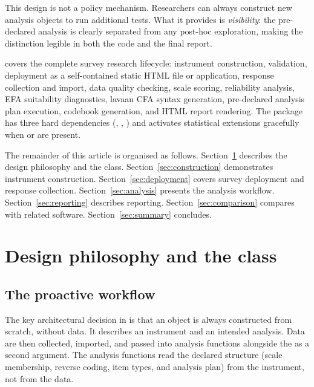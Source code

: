 \documentclass[article]{jss}\usepackage[]{graphicx}\usepackage[]{xcolor}
\begin{document}
This design is not a policy mechanism. Researchers can always construct
new analysis objects to run additional tests. What it provides is
\emph{visibility}: the pre-declared analysis is clearly separated from
any post-hoc exploration, making the distinction legible in both the
code and the final report.

 covers the complete survey research lifecycle:
instrument construction, validation, deployment as a self-contained
static HTML file or  application, response collection and
import, data quality checking, scale scoring, reliability analysis,
EFA suitability diagnostics, lavaan CFA syntax generation, pre-declared
analysis plan execution, codebook generation, and HTML report rendering.
The package has three hard dependencies (, ,
) and activates statistical extensions gracefully when
 or  are present.

The remainder of this article is organised as follows.
Section~\ref{sec:design} describes the design philosophy and the
 class.
Section~\ref{sec:construction} demonstrates instrument construction.
Section~\ref{sec:deployment} covers survey deployment and response
collection.
Section~\ref{sec:analysis} presents the analysis workflow.
Section~\ref{sec:reporting} describes reporting.
Section~\ref{sec:comparison} compares  with related
software.
Section~\ref{sec:summary} concludes.

\section[Design philosophy and the sframe class]{Design philosophy and the  class}
\label{sec:design}

\subsection{The proactive workflow}

The key architectural decision in  is that an
 object is always constructed from scratch, without data.
It describes an instrument and an intended analysis. Data are then
collected, imported, and passed into analysis functions alongside the
 as a second argument. The analysis functions read the
declared structure (scale membership, reverse coding, item types,
and analysis plan) from the instrument, not from the data.
\end{document}

